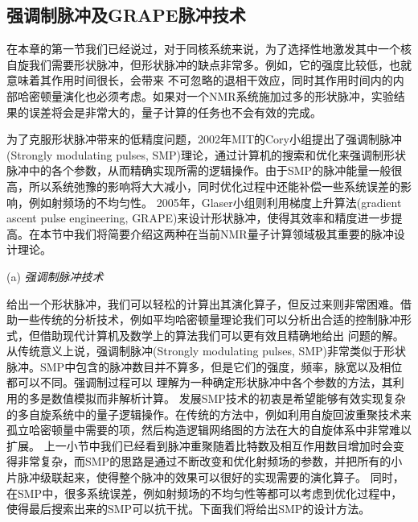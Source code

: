 

\subsection{强调制脉冲及GRAPE脉冲技术}

在本章的第一节我们已经说过，对于同核系统来说，为了选择性地激发其中一个核自旋我们需要形状脉冲，但形状脉冲的缺点非常多。例如，它的强度比较低，也就意味着其作用时间很长，会带来
不可忽略的退相干效应，同时其作用时间内的内部哈密顿量演化也必须考虑。如果对一个NMR系统施加过多的形状脉冲，实验结果的误差将会是非常大的，量子计算的任务也不会有效的完成。

为了克服形状脉冲带来的低精度问题，2002年MIT的Cory小组提出了强调制脉冲(Strongly modulating pulses, SMP)\cite{smp1}理论，通过计算机的搜索和优化来强调制形状脉冲中的各个参数，从而精确实现所需的逻辑操作。由于SMP的脉冲能量一般很高，所以系统弛豫的影响将大大减小，同时优化过程中还能补偿一些系统误差的影响，例如射频场的不均匀性。
2005年，Glaser小组则利用梯度上升算法(gradient ascent pulse engineering, GRAPE)来设计形状脉冲，使得其效率和精度进一步提高。在本节中我们将简要介绍这两种在当前NMR量子计算领域极其重要的脉冲设计理论。

(a) \emph{强调制脉冲技术}

给出一个形状脉冲，我们可以轻松的计算出其演化算子，但反过来则非常困难。借助一些传统的分析技术，例如平均哈密顿量理论我们可以分析出合适的控制脉冲形式，但借助现代计算机及数学上的算法我们可以更有效且精确地给出
问题的解。从传统意义上说，强调制脉冲(Strongly modulating pulses, SMP)\cite{smp1,smp2,smp3}非常类似于形状脉冲。SMP中包含的脉冲数目并不算多，但是它们的强度，频率，脉宽以及相位都可以不同。强调制过程可以
理解为一种确定形状脉冲中各个参数的方法，其利用的多是数值模拟而非解析计算。 发展SMP技术的初衷是希望能够有效实现复杂的多自旋系统中的量子逻辑操作。在传统的方法中，例如利用自旋回波重聚技术来孤立哈密顿量中需要的项，然后构造逻辑网络图的方法在大的自旋体系中非常难以扩展。
上一小节中我们已经看到脉冲重聚随着比特数及相互作用数目增加时会变得非常复杂，而SMP的思路是通过不断改变和优化射频场的参数，并把所有的小片脉冲级联起来，使得整个脉冲的效果可以很好的实现需要的演化算子。
同时，在SMP中，很多系统误差，例如射频场的不均匀性等都可以考虑到优化过程中，使得最后搜索出来的SMP可以抗干扰。下面我们将给出SMP的设计方法。

